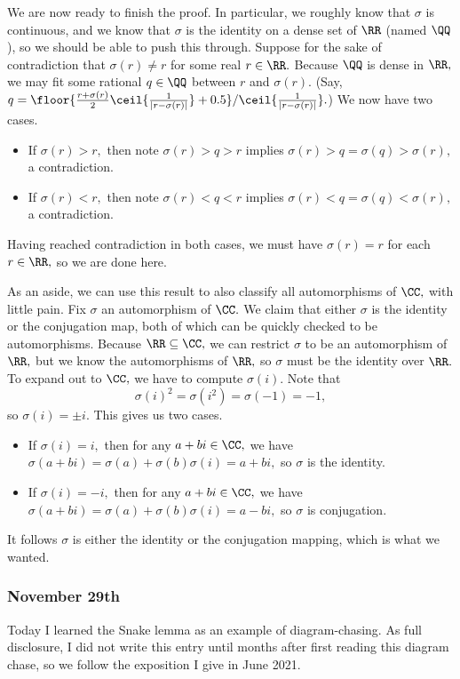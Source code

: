 We are now ready to finish the proof. In particular, we roughly know that $\sigma$ is continuous, and we know that $\sigma$ is the identity on a dense set of $\RR$ (named $\QQ$), so we should be able to push this through. Suppose for the sake of contradiction that $\sigma(r)\ne r$ for some real $r\in\RR.$ Because $\QQ$ is dense in $\RR,$ we may fit some rational $q\in\QQ$ between $r$ and $\sigma(r).$ (Say, $q=\floor{\frac{r+\sigma(r)}2\ceil{\frac1{|r-\sigma(r)|}}+0.5}/\ceil{\frac1{|r-\sigma(r)|}}.$) We now have two cases.
\begin{itemize}
    \item If $\sigma(r)>r,$ then note $\sigma(r)>q>r$ implies $\sigma(r)>q=\sigma(q)>\sigma(r),$ a contradiction.
    \item If $\sigma(r)<r,$ then note $\sigma(r)<q<r$ implies $\sigma(r)<q=\sigma(q)<\sigma(r),$ a contradiction.
\end{itemize}
Having reached contradiction in both cases, we must have $\sigma(r)=r$ for each $r\in\RR,$ so we are done here.

As an aside, we can use this result to also classify all automorphisms of $\CC,$ with little pain. Fix $\sigma$ an automorphism of $\CC.$ We claim that either $\sigma$ is the identity or the conjugation map, both of which can be quickly checked to be automorphisms. Because $\RR\subseteq\CC,$ we can restrict $\sigma$ to be an automorphism of $\RR,$ but we know the automorphisms of $\RR,$ so $\sigma$ must be the identity over $\RR.$ To expand out to $\CC,$ we have to compute $\sigma(i).$ Note that
\[\sigma(i)^2=\sigma\left(i^2\right)=\sigma(-1)=-1,\]
so $\sigma(i)=\pm i.$ This gives us two cases.
\begin{itemize}
    \item If $\sigma(i)=i,$ then for any $a+bi\in\CC,$ we have $\sigma(a+bi)=\sigma(a)+\sigma(b)\sigma(i)=a+bi,$ so $\sigma$ is the identity.
    \item If $\sigma(i)=-i,$ then for any $a+bi\in\CC,$ we have $\sigma(a+bi)=\sigma(a)+\sigma(b)\sigma(i)=a-bi,$ so $\sigma$ is conjugation.
\end{itemize}
It follows $\sigma$ is either the identity or the conjugation mapping, which is what we wanted.

\subsubsection{November 29th}
Today I learned the Snake lemma as an example of diagram-chasing. As full disclosure, I did not write this entry until months after first reading this diagram chase, so we follow the exposition I give in June 2021.

